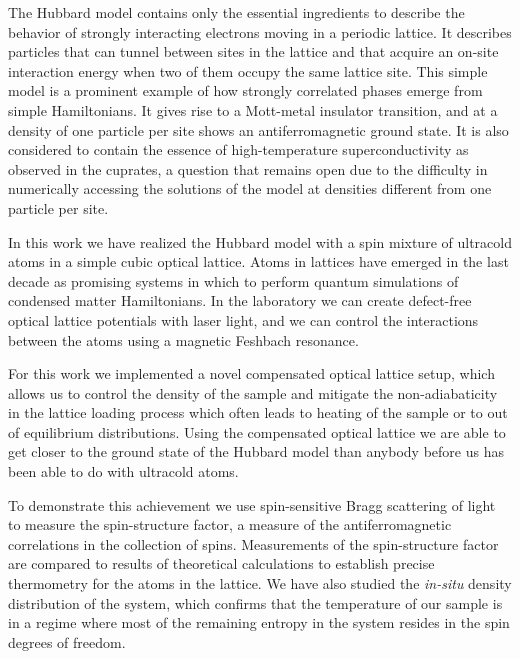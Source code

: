 \documentclass[twoside,11pt]{memoir}
\begin{document}
\pagestyle{plain}          %

\frontmatter
\thetitlepage



\riceabstract
\pagestyle{empty}  %


The Hubbard model contains only the essential ingredients to describe the
behavior of strongly interacting electrons moving in a periodic lattice.   It
describes particles that can tunnel between sites in the lattice and that
acquire an on-site interaction energy when two of them occupy the same lattice
site.   This simple model is a prominent example of how strongly correlated
phases emerge from simple Hamiltonians.  It gives rise to a Mott-metal
insulator transition,  and at a density of one particle per site shows an
antiferromagnetic ground state.  It is also considered to contain the essence
of high-temperature superconductivity as observed in the cuprates, a question
that remains open due to the difficulty in numerically accessing the solutions
of the model at densities different from one particle per site.  

In this work we have realized the Hubbard model with a spin mixture of
ultracold atoms in a simple cubic optical lattice.  Atoms in lattices have
emerged in the last decade as promising systems in which to perform quantum
simulations of condensed matter Hamiltonians.   In the laboratory we can create
defect-free optical lattice potentials with laser light, and we can control the
interactions between the atoms using a magnetic Feshbach resonance.  

For this work we implemented a novel compensated optical lattice setup, which
allows us to control the density of the sample and mitigate the
non-adiabaticity in the lattice loading process which often leads to heating of
the sample or to out of equilibrium distributions.   Using the compensated
optical lattice we are able to get closer to the ground state of the Hubbard
model than anybody before us has been able to do with ultracold atoms.

To demonstrate this achievement we use spin-sensitive Bragg scattering of light
to measure the spin-structure factor, a measure of the antiferromagnetic
correlations in the collection of spins.  Measurements of the spin-structure
factor are compared to results of theoretical calculations to establish precise
thermometry for the atoms in the lattice.  We have also studied the
\textit{in-situ} density distribution of the system, which confirms that the
temperature of our sample is in a regime where most of the remaining entropy in
the system resides in the spin degrees of freedom.  
\end{document}
